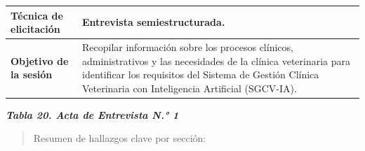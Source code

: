 \documentclass[
]{article}
\begin{document}
{\begin{longtable}[]{|
  >{\raggedright\arraybackslash}p{}|
  >{\raggedright\arraybackslash}p{}|}
\hline
\textbf{Técnica de elicitación} &
\begin{minipage}[t]{\linewidth}\raggedright
Entrevista semiestructurada.
\end{minipage} \\
\hline
\textbf{Objetivo de la sesión} &
\begin{minipage}[t]{\linewidth}\raggedright
Recopilar información sobre los procesos clínicos, administrativos y las
necesidades de la clínica veterinaria para identificar los requisitos
del Sistema de Gestión Clínica Veterinaria con Inteligencia Artificial
(SGCV-IA).
\end{minipage} \\
\hline
\end{longtable}
}

\protect{}\label{_bookmark79}{}\emph{\textbf{Tabla 20. Acta
de Entrevista N.° 1}}

\begin{quote}
Resumen de hallazgos clave por sección:
\end{quote}
\end{document}
